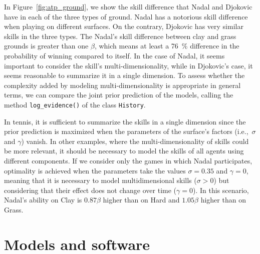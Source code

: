 \documentclass[article]{jss}
\begin{document}
%
%

In Figure~\ref{fig:atp_ground}, we show the skill difference that Nadal and Djokovic have in each of the three types of ground. 
Nadal has a notorious skill difference when playing on different surfaces. 
On the contrary, Djokovic has very similar skills in the three types. 
The Nadal's skill difference between clay and grass grounds is greater than one $\beta$, which means at least a \SI{76}{\percent} difference in the probability of winning compared to itself. 
In the case of Nadal, it seems important to consider the skill's multi-dimensionality, while in Djokovic's case, it seems reasonable to summarize it in a single dimension. 
To assess whether the complexity added by modeling multi-dimensionality is appropriate in general terms, we can compare the joint prior prediction of the models, calling the method \texttt{log\_evidence()} of the class \texttt{History}. 


In tennis, it is sufficient to summarize the skills in a single dimension since the prior prediction is maximized when the parameters of the surface's factors (i.e.,~$\sigma$ and $\gamma$) vanish. 
In other examples, where the multi-dimensionality of skills could be more relevant, it should be necessary to model the skills of all agents using different components. 
If we consider only the games in which Nadal participates, optimality is achieved when the parameters take the values $\sigma=0.35$ and $\gamma=0$, meaning that it is necessary to model multidimensional skills ($\sigma>0$) but considering that their effect does not change over time ($\gamma = 0$). 
In this scenario, Nadal's ability on Clay is $0.87\beta$ higher than on Hard and $1.05\beta$ higher than on Grass. 

\section{Models and software} 
\end{document}
